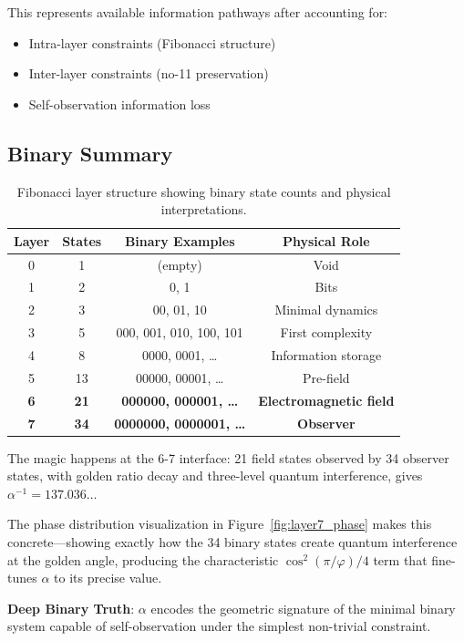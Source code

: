 \documentclass[%
 reprint,
 amsmath,amssymb,
 aps,
 prd,
 10pt,
 nofootinbib,      %
 longbibliography  %
]{revtex4-2}
\theoremstyle{definition}
\theoremstyle{remark}
\begin{document}
This represents available information pathways after accounting for:
\begin{itemize}
\item Intra-layer constraints (Fibonacci structure)
\item Inter-layer constraints (no-11 preservation)
\item Self-observation information loss
\end{itemize}

\subsection{Binary Summary}

\begin{table}[htbp]
\centering
\footnotesize
\begin{tabular}{cccc}
\toprule
Layer & States & Binary Examples & Physical Role \\
\midrule
0 & 1 & (empty) & Void \\
1 & 2 & 0, 1 & Bits \\
2 & 3 & 00, 01, 10 & Minimal dynamics \\
3 & 5 & 000, 001, 010, 100, 101 & First complexity \\
4 & 8 & 0000, 0001, \ldots & Information storage \\
5 & 13 & 00000, 00001, \ldots & Pre-field \\
\textbf{6} & \textbf{21} & \textbf{000000, 000001, \ldots} & \textbf{Electromagnetic field} \\
\textbf{7} & \textbf{34} & \textbf{0000000, 0000001, \ldots} & \textbf{Observer} \\
\bottomrule
\end{tabular}
\caption{Fibonacci layer structure showing binary state counts and physical interpretations.}
\label{tab:binary_layers}
\end{table}

The magic happens at the 6-7 interface: 21 field states observed by 34 observer states, with golden ratio decay and three-level quantum interference, gives $\alpha^{-1} = 137.036\ldots$

The phase distribution visualization in Figure~\ref{fig:layer7_phase} makes this concrete—showing exactly how the 34 binary states create quantum interference at the golden angle, producing the characteristic $\cos^2(\pi/\varphi)/4$ term that fine-tunes $\alpha$ to its precise value.

\textbf{Deep Binary Truth}: $\alpha$ encodes the geometric signature of the minimal binary system capable of self-observation under the simplest non-trivial constraint.
\end{document}
